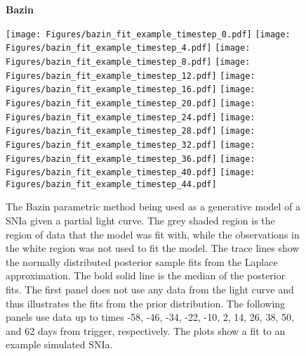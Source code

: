 \documentclass[fleqn,usenatbib]{mnras}
\begin{document}
\begin{figure*}
\centering
\textbf{Bazin}\par\medskip
\vspace{-0.5em}
    {\texttt{[image: Figures/bazin\_fit\_example\_timestep\_0.pdf]}}
    {\texttt{[image: Figures/bazin\_fit\_example\_timestep\_4.pdf]}}
    {\texttt{[image: Figures/bazin\_fit\_example\_timestep\_8.pdf]}}
    {\texttt{[image: Figures/bazin\_fit\_example\_timestep\_12.pdf]}}
    {\texttt{[image: Figures/bazin\_fit\_example\_timestep\_16.pdf]}}
    {\texttt{[image: Figures/bazin\_fit\_example\_timestep\_20.pdf]}}
    {\texttt{[image: Figures/bazin\_fit\_example\_timestep\_24.pdf]}}
    {\texttt{[image: Figures/bazin\_fit\_example\_timestep\_28.pdf]}}  {\texttt{[image: Figures/bazin\_fit\_example\_timestep\_32.pdf]}}
    {\texttt{[image: Figures/bazin\_fit\_example\_timestep\_36.pdf]}}
    {\texttt{[image: Figures/bazin\_fit\_example\_timestep\_40.pdf]}}
    {\texttt{[image: Figures/bazin\_fit\_example\_timestep\_44.pdf]}}

\caption{The Bazin parametric method being used as a generative model of a SNIa given a partial light curve. The grey shaded region is the region of data that the model was fit with, while the observations in the white region was not used to fit the model. The trace lines show the normally distributed posterior sample fits from the Laplace approximation. The bold solid line is the median of the posterior fits. The first panel does not use any data from the light curve and thus illustrates the fits from the prior distribution. The following panels use data up to times -58, -46, -34, -22, -10, 2, 14, 26, 38, 50, and 62 days from trigger, respectively. The plots show a fit to an example simulated SNIa.}
    \label{fig:Bazin_generative_plots}
\end{figure*}
\end{document}
